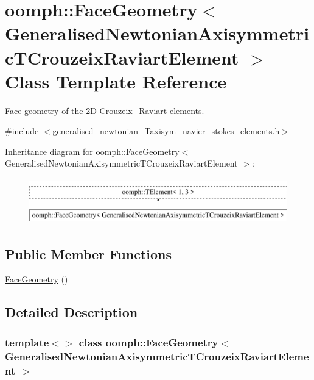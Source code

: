 \hypertarget{classoomph_1_1FaceGeometry_3_01GeneralisedNewtonianAxisymmetricTCrouzeixRaviartElement_01_4}{}\section{oomph\+:\+:Face\+Geometry$<$ Generalised\+Newtonian\+Axisymmetric\+T\+Crouzeix\+Raviart\+Element $>$ Class Template Reference}
\label{classoomph_1_1FaceGeometry_3_01GeneralisedNewtonianAxisymmetricTCrouzeixRaviartElement_01_4}


Face geometry of the 2D Crouzeix\+\_\+\+Raviart elements.  




{\ttfamily \#include $<$generalised\+\_\+newtonian\+\_\+\+Taxisym\+\_\+navier\+\_\+stokes\+\_\+elements.\+h$>$}

Inheritance diagram for oomph\+:\+:Face\+Geometry$<$ Generalised\+Newtonian\+Axisymmetric\+T\+Crouzeix\+Raviart\+Element $>$\+:\begin{figure}[H]
\begin{center}
\leavevmode
\includegraphics[height=2.000000cm]{classoomph_1_1FaceGeometry_3_01GeneralisedNewtonianAxisymmetricTCrouzeixRaviartElement_01_4}
\end{center}
\end{figure}
\subsection*{Public Member Functions}
\begin{DoxyCompactItemize}
\item 
\hyperlink{classoomph_1_1FaceGeometry_3_01GeneralisedNewtonianAxisymmetricTCrouzeixRaviartElement_01_4_ac20d2f6f91760aee922fb938086c7f0a}{Face\+Geometry} ()
\end{DoxyCompactItemize}


\subsection{Detailed Description}
\subsubsection*{template$<$$>$\newline
class oomph\+::\+Face\+Geometry$<$ Generalised\+Newtonian\+Axisymmetric\+T\+Crouzeix\+Raviart\+Element $>$}

